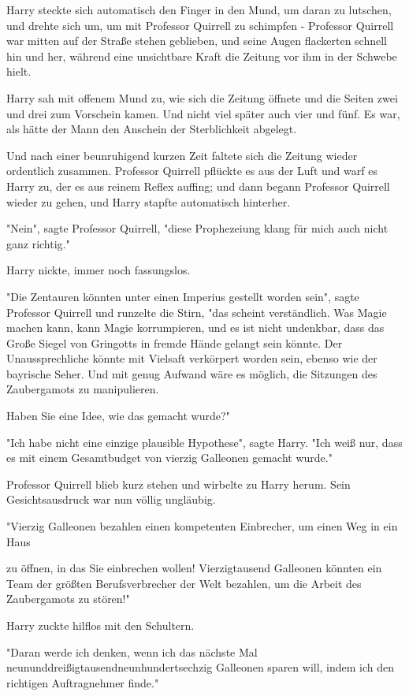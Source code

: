 {Harry steckte sich automatisch den Finger in den Mund, um daran zu lutschen, und drehte sich um, um mit Professor Quirrell zu schimpfen - Professor Quirrell war mitten auf der Straße stehen geblieben, und seine Augen flackerten schnell hin und her, während eine unsichtbare Kraft die Zeitung vor ihm in der Schwebe hielt.

Harry sah mit offenem Mund zu, wie sich die Zeitung öffnete und die Seiten zwei und drei zum Vorschein kamen. Und nicht viel später auch vier und fünf. Es war, als hätte der Mann den Anschein der Sterblichkeit abgelegt.

Und nach einer beunruhigend kurzen Zeit faltete sich die Zeitung wieder ordentlich zusammen. Professor Quirrell pflückte es aus der Luft und warf es Harry zu, der es aus reinem Reflex auffing; und dann begann Professor Quirrell wieder zu gehen, und Harry stapfte automatisch hinterher.

"Nein", sagte Professor Quirrell, "diese Prophezeiung klang für mich auch nicht ganz richtig."

Harry nickte, immer noch fassungslos.

"Die Zentauren könnten unter einen Imperius gestellt worden sein", sagte Professor Quirrell und runzelte die Stirn, "das scheint verständlich. Was Magie machen kann, kann Magie korrumpieren, und es ist nicht undenkbar, dass das Große Siegel von Gringotts in fremde Hände gelangt sein könnte. Der Unaussprechliche könnte mit Vielsaft verkörpert worden sein, ebenso wie der bayrische Seher. Und mit genug Aufwand wäre es möglich, die Sitzungen des Zaubergamots zu manipulieren.

Haben Sie eine Idee, wie das gemacht wurde?"

"Ich habe nicht eine einzige plausible Hypothese", sagte Harry. "Ich weiß nur, dass es mit einem Gesamtbudget von vierzig Galleonen gemacht wurde."

Professor Quirrell blieb kurz stehen und wirbelte zu Harry herum. Sein Gesichtsausdruck war nun völlig ungläubig.

"Vierzig Galleonen bezahlen einen kompetenten Einbrecher, um einen Weg in ein Haus

zu öffnen, in das Sie einbrechen wollen! Vierzigtausend Galleonen könnten ein Team der größten Berufsverbrecher der Welt bezahlen, um die Arbeit des Zaubergamots zu stören!"

Harry zuckte hilflos mit den Schultern.

"Daran werde ich denken, wenn ich das nächste Mal neununddreißigtausendneunhundertsechzig Galleonen sparen will, indem ich den richtigen Auftragnehmer finde."

}
